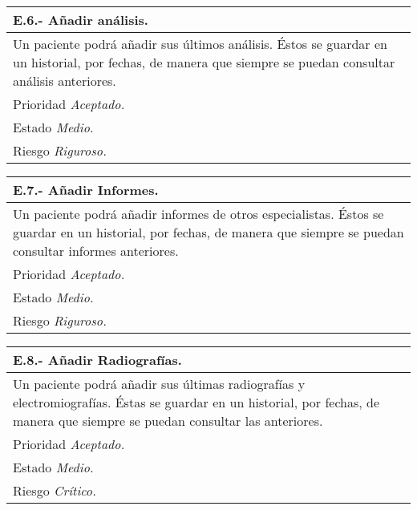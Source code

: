 	\begin{center}
	\begin{tabulary}{15cm}{|L|}
		\hline
			\bf{E.6.- Añadir análisis.} \\
		\hline
			Un paciente podrá añadir sus últimos análisis. Éstos se guardar en un historial, por fechas, de manera que siempre se puedan consultar análisis anteriores. \\
		\hline
			Prioridad \textit{Aceptado.} \\
		\hline
			Estado \textit{Medio.} \\
		\hline
			Riesgo \textit{Riguroso.} \\
		\hline
	\end{tabulary}
	\end{center}

	\begin{center}
	\begin{tabulary}{15cm}{|L|}
		\hline
			\bf{E.7.- Añadir Informes.} \\
		\hline
			Un paciente podrá añadir informes de otros especialistas. Éstos se guardar en un historial, por fechas, de manera que siempre se puedan consultar informes anteriores. \\
		\hline
			Prioridad \textit{Aceptado.} \\
		\hline
			Estado \textit{Medio.} \\
		\hline
			Riesgo \textit{Riguroso.} \\
		\hline
	\end{tabulary}
	\end{center}

	\begin{center}
	\begin{tabulary}{15cm}{|L|}
		\hline
			\bf{E.8.- Añadir Radiografías.} \\
		\hline
			Un paciente podrá añadir sus últimas radiografías y electromiografías. Éstas se guardar en un historial, por fechas, de manera que siempre se puedan consultar las anteriores. \\
		\hline
			Prioridad \textit{Aceptado.} \\
		\hline
			Estado \textit{Medio.} \\
		\hline
			Riesgo \textit{Crítico.} \\
		\hline
	\end{tabulary}
	\end{center}

